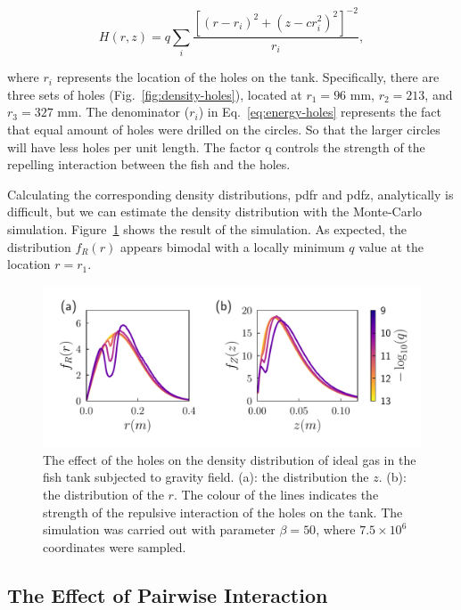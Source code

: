 \documentclass[11pt,twoside]{report}
\begin{document}
\begin{equation}
	H(r, z) = q
		\sum_i{\frac{
		\left[
			(r - r_i)^2 + (z - c r_i^2)^2
		\right]^{-2}
		}{r_i}},
\label{eq:energy-holes}
\end{equation}

\noindent where $r_i$ represents the location of the holes on the tank. Specifically, there are three sets of holes (Fig.~\ref{fig:density-holes}), located at $r_1=96$ mm, $r_2=213$, and $r_3=327$ mm. The denominator ($r_i$) in Eq.~\ref{eq:energy-holes} represents the fact that equal amount of holes were drilled on the circles. So that the larger circles will have less holes per unit length. The factor \gls{q} controls the strength of the repelling interaction between the fish and the holes.

Calculating the corresponding density distributions, \gls{pdfr} and \gls{pdfz}, analytically is difficult, but we can estimate the density distribution with the Monte-Carlo simulation. Figure~\ref{fig:dist-holes} shows the result of the simulation. As expected, the distribution $f_R(r)$ appears bimodal with a locally minimum $q$ value at the location $r = r_1$.

\begin{figure}
  \includegraphics[width=\linewidth]{density-holes}
  \caption[The effect of the holes on the density distribution]{
  The effect of the holes on the density distribution of ideal gas in the fish tank subjected to gravity field.
  (a): the distribution the $z$.
  (b): the distribution of the $r$.
  The colour of the lines indicates the strength of the repulsive interaction of the holes on the tank. The simulation was carried out with parameter $\beta=50$, where $7.5 \times 10^{6}$ coordinates were sampled.
  }
  \label{fig:dist-holes}
\end{figure}


\subsection{The Effect of Pairwise Interaction}
\label{section:sim-mc-interaction}
\end{document}
